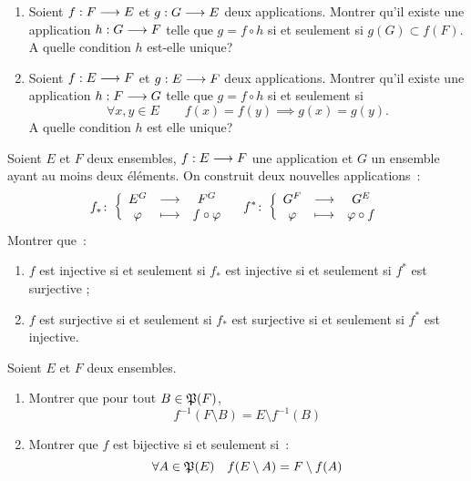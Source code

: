 \begin{exercice}
    \begin{enumerate}
        \item Soient \(f:F \longrightarrow E\) et \(g:G \longrightarrow E\) deux 
            applications. Montrer qu'il existe une application 
            \(h:G \longrightarrow F\) telle que \(g = f \circ h\) si et seulement 
            si \(g(G) \subset f(F)\). A quelle condition \(h\) est-elle unique?
        \item Soient \(f:E \longrightarrow F\) et \(g:E \longrightarrow F\) deux 
            applications. Montrer qu'il existe une application 
            \(h:F \longrightarrow G\) telle que \(g = f \circ h\) si et seulement 
            si 
            \begin{equation}
                \forall x,y \in E \qquad f(x)=f(y) \implies g(x)=g(y).
            \end{equation}
            A quelle condition \(h\) est elle unique?
    \end{enumerate}
\end{exercice}

\begin{exercice}
    Soient \(E\) et \(F\) deux ensembles, \(f:E \longrightarrow F\) une 
    application et \(G\) un ensemble ayant au moins deux éléments. On construit 
    deux nouvelles applications~:
    \begin{equation}
        f_{*}\colon \left\{\begin{array}{ccc} E^G & \longrightarrow &F^G\\ \varphi & \longmapsto & f \circ \varphi \end{array} \right. \quad 
        f^{*}\colon \left\{\begin{array}{ccc} G^F & \longrightarrow &G^E\\ \varphi & \longmapsto & \varphi \circ f \end{array} \right.
    \end{equation}
    Montrer que~:
    \begin{enumerate}
        \item \(f\) est injective si et seulement si \(f_{*}\) est injective si 
            et seulement si \(f^{*}\) est surjective ;
        \item \(f\) est surjective si et seulement si \(f_{*}\) est surjective 
            si et seulement si \(f^{*}\) est injective.
    \end{enumerate}
\end{exercice}

\begin{exercice}
    Soient \(E\) et \(F\) deux ensembles.
    \begin{enumerate}
        \item Montrer que pour tout \(B \in \mathfrak{P}(F)\),
            \begin{equation}
                f^{-1}(F\setminus B) = E \setminus f^{-1}(B)
            \end{equation}
        \item Montrer que \(f\) est bijective si et seulement si~:
            \begin{equation}
                \forall A \in \mathfrak{P}(E) \quad f(E\setminus A) = F\setminus f(A)
            \end{equation}
    \end{enumerate}
\end{exercice}

